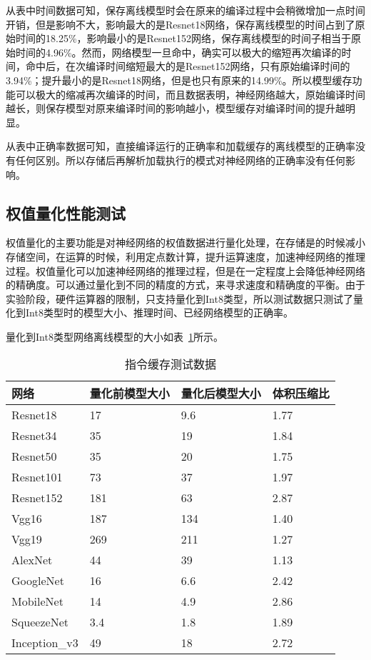 从表中时间数据可知，保存离线模型时会在原来的编译过程中会稍微增加一点时间开销，但是影响不大，影响最大的是Resnet18网络，保存离线模型的时间占到了原始时间的18.25\%，影响最小的是Resnet152网络，保存离线模型的时间子相当于原始时间的4.96\%。然而，网络模型一旦命中，确实可以极大的缩短再次编译的时间，命中后，在次编译时间缩短最大的是Resnet152网络，只有原始编译时间的3.94\%；提升最小的是Resnet18网络，但是也只有原来的14.99\%。所以模型缓存功能可以极大的缩减再次编译的时间，而且数据表明，神经网络越大，原始编译时间越长，则保存模型对原来编译时间的影响越小，模型缓存对编译时间的提升越明显。

从表中正确率数据可知，直接编译运行的正确率和加载缓存的离线模型的正确率没有任何区别。所以存储后再解析加载执行的模式对神经网络的正确率没有任何影响。

\subsection {权值量化性能测试}
权值量化的主要功能是对神经网络的权值数据进行量化处理，在存储是的时候减小存储空间，在运算的时候，利用定点数计算，提升运算速度，加速神经网络的推理过程。权值量化可以加速神经网络的推理过程，但是在一定程度上会降低神经网络的精确度。可以通过量化到不同的精度的方式，来寻求速度和精确度的平衡。由于实验阶段，硬件运算器的限制，只支持量化到Int8类型，所以测试数据只测试了量化到Int8类型时的模型大小、推理时间、已经网络模型的正确率。

量化到Int8类型网络离线模型的大小如表~\ref{tab:experiment-quant-data}所示。

\begin{table}[htb]
  \centering\small
  \caption{指令缓存测试数据}
  \label{tab:experiment-quant-data}
  \begin{tabular}{llll}
    \toprule
    网络      & 量化前模型大小 & 量化后模型大小 & 体积压缩比 \\
    \midrule
    Resnet18  & 17  & 9.6 & 1.77  \\
    Resnet34  & 35  & 19  & 1.84  \\
    Resnet50  & 35  & 20  & 1.75  \\
    Resnet101 & 73  & 37  & 1.97  \\
    Resnet152 & 181 & 63  & 2.87  \\
    Vgg16     & 187 & 134 & 1.40  \\
    Vgg19     & 269 & 211 & 1.27  \\
    AlexNet   & 44  & 39  & 1.13  \\
    GoogleNet & 16  & 6.6 & 2.42  \\
    MobileNet & 14  & 4.9 & 2.86  \\
    SqueezeNet& 3.4 & 1.8 & 1.89  \\
    Inception\_v3  & 49  & 18  & 2.72 \\
    \bottomrule
  \end{tabular}
\end{table}

